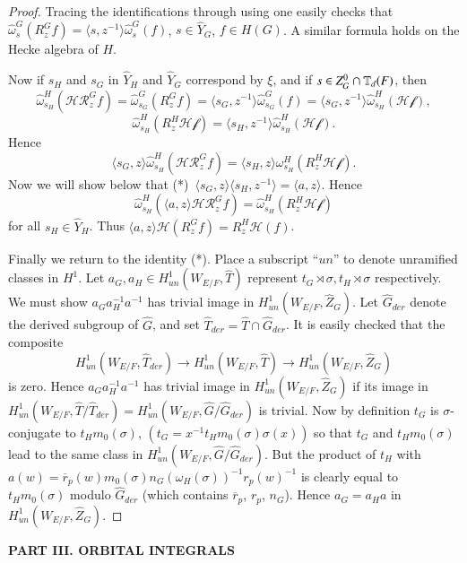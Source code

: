 \documentclass{amsart}
\def\what#1{\widehat#1}
\def\MACDONALD{23}
\begin{document}
\begin{proof}
Tracing the identifications through using \cite{\MACDONALD}
one easily checks that $\what\omega_s^G(R_z^Gf) = \langle s,z^{-1}\rangle
\what\omega_s^G(f)$, $s\in \what Y_G$, $f\in H(G)$.  A similar
formula holds on the Hecke algebra of $H$.

Now if $s_H$ and $s_G$ in $\what Y_H$ and $\what Y_G$ correspond
by $\xi$, and if $s\in Z_G^0\cap \Bbb T_d(F)$, then
$$\what\omega^H_{s_H}(\mathcal{ HR}_z^Gf) = 
  \what\omega_{s_G}^G(R_z^Gf) = \langle s_G,z^{-1}\rangle \what\omega^G_{s_G}(f) =
  \langle s_G,z^{-1}\rangle \what\omega_{s_H}^H(\mathcal{ Hf}),$$
$$\what\omega_{s_H}^H(R_z^H\mathcal{ Hf}) = \langle s_H,z^{-1}\rangle
	\what\omega_{s_H}^H(\mathcal{ Hf}).$$
Hence
$$\langle s_G,z\rangle\what\omega_{s_H}^H(\mathcal{ HR}_z^Gf) =
	\langle s_H,z\rangle \omega_{s_H}^H(R_z^H\mathcal{ Hf}).$$
Now we will show below that (*)\ $\langle s_G,z\rangle\langle s_H,z^{-1}\rangle
	= \langle a,z\rangle$.
Hence 
$$\what\omega_{s_H}^H(\langle a,z\rangle \mathcal{ HR}_z^Gf) = 
	\what\omega^H_{s_H}(R_z^H\mathcal{ Hf})$$
for all $s_H\in \what Y_H$.  Thus $\langle a,z\rangle \mathcal{ H}(R^G_zf)
	=R_z^H\mathcal{ H}(f)$.

Finally we return to the identity (*).  Place a subscript ``$un$''
to denote unramified classes in $H^1$.
Let $a_G,a_H\in H^1_{un}(W_{E/F},\what T)$ represent $t_G\rtimes\sigma,
t_H\rtimes\sigma$ respectively.  We must show $a_Ga_H^{-1}a^{-1}$
has trivial image in $H^1_{un}(W_{E/F},\what Z_G)$.  Let $\what G_{der}$ denote
the derived subgroup of $\what G$, and set $\what T_{der} = \what T\cap
\what G_{der}$.  It is easily checked that the composite
$$H^1_{un}(W_{E/F},\what T_{der}) \to H^1_{un}(W_{E/F},\what T) \to
  H^1_{un}(W_{E/F},\what Z_G)$$
is zero.  Hence $a_Ga_H^{-1}a^{-1}$ has trivial image in $H^1_{un}(W_{E/F},\what Z_G)$
if its image in $H^1_{un}(W_{E/F},\what T/\what T_{der}) =
H^1_{un}(W_{E/F},\what G/\what G_{der})$ is trivial.
Now by definition $t_G$ is $\sigma$-conjugate to $t_Hm_0(\sigma)$,
$(t_G = x^{-1}t_Hm_0(\sigma)\sigma(x))$ so that $t_G$ and $t_Hm_0(\sigma)$
lead to the same class in $H^1_{un}(W_{E/F},\what G/\what G_{der})$.
But the product of $t_H$ with $a(w) = \overline r_p(w) m_0(\sigma) 
n_G(\omega_H(\sigma))^{-1} r_p(w)^{-1}$ is clearly equal to
$t_Hm_0(\sigma)$ modulo $\what G_{der}$ (which contains $\overline r_p$,
$r_p$, $n_G$).  Hence $a_G = a_Ha$ in $H^1_{un}(W_{E/F},\what Z_G)$.
\end{proof}

\vfil\eject
\centerline{\bf PART III.  ORBITAL INTEGRALS}\vskip3pc
\end{document}
